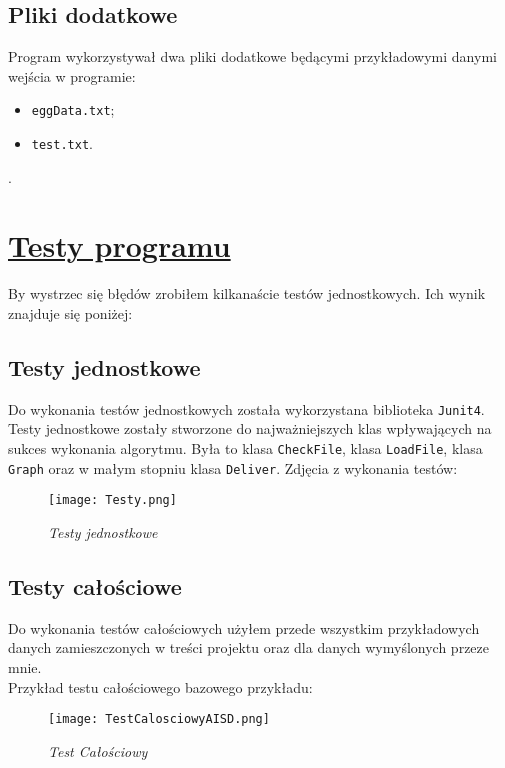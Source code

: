 \documentclass{article}
\begin{document}
\subsection{Pliki dodatkowe}
Program wykorzystywał dwa pliki dodatkowe będącymi przykładowymi danymi wejścia w programie:
\begin{itemize}
\item \verb|eggData.txt|;
\item \verb|test.txt|.
\end{itemize}.
\newpage
\section{\underline{Testy programu}}
\indent By wystrzec się błędów zrobiłem kilkanaście testów jednostkowych. Ich wynik znajduje się poniżej:
\subsection{Testy jednostkowe}
\indent Do wykonania testów jednostkowych została wykorzystana biblioteka \verb|Junit4|. Testy jednostkowe zostały stworzone do najważniejszych klas wpływających na sukces wykonania algorytmu. Była to klasa \verb|CheckFile|, klasa \verb|LoadFile|,  klasa \verb|Graph| oraz w małym stopniu klasa \verb|Deliver|.
Zdjęcia z wykonania testów:\\
\vspace{1cm}
\begin{figure}[h]
		\hspace*{2.7cm} 
			\texttt{[image: Testy.png]}
				\caption[Testy jednostkowe] {{\sl Testy jednostkowe}}
				
		\end{figure}
\newpage

\subsection{Testy całościowe}
\indent Do wykonania testów całościowych użyłem przede wszystkim przykładowych danych zamieszczonych w treści projektu oraz dla danych wymyślonych przeze mnie.\\
 Przykład testu całościowego bazowego przykładu:
\vspace{1cm}
\begin{figure}[h]
\hspace*{-1.5cm} 
\texttt{[image: TestCalosciowyAISD.png]}
\caption[Test Całościowy] {{\sl Test Całościowy}}
\end{figure}
\end{document}
